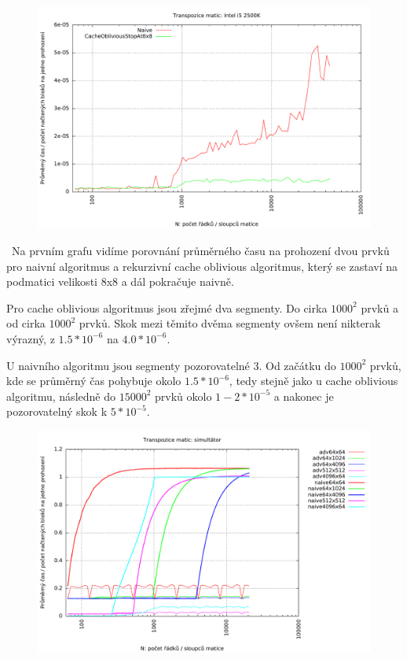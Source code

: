 \documentclass[12pt,a4paper]{report}
\begin{document}
	
	\begin{figure}[h]	
		\centering	
		\includegraphics[scale=0.6]{graph_1}		
	\end{figure}
\
	Na prvním grafu vidíme porovnání průměrného času na prohození dvou prvků pro naivní algoritmus a rekurzivní cache oblivious algoritmus, který se zastaví na podmatici velikosti 8x8 a dál pokračuje naivně. 
	
	Pro cache oblivious algoritmus jsou zřejmé dva segmenty. Do cirka $1000^2$ prvků a od cirka $1000^2$ prvků. Skok mezi těmito dvěma segmenty ovšem není nikterak výrazný, z $1.5 * 10^{-6}$ na $4.0 * 10^{-6}$.
	
	U naivního algoritmu jsou segmenty pozorovatelné 3. Od začátku do $1000^2$ prvků, kde se průměrný čas pohybuje okolo $1.5 * 10^{-6}$, tedy stejně jako u cache oblivious algoritmu, následně do 	$15000^2$ prvků okolo $1-2 * 10^{-5}$ a nakonec je pozorovatelný skok k $5*10^{-5}$.

	\begin{figure}[h]	
	\centering	
	\includegraphics[scale=0.6]{graph_2}		
	\end{figure}
\end{document}
